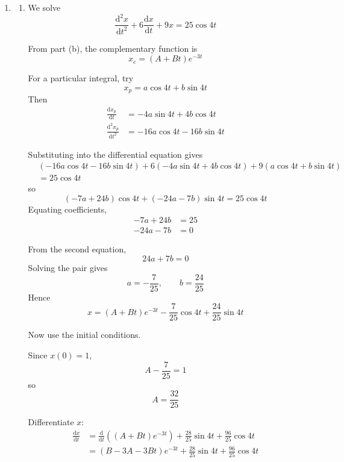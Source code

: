 \documentclass[leqno]{article}
\begin{document}
\begin{enumerate}[
  label=\textbf{\arabic*.},
  leftmargin=*,
  topsep=0pt,
  partopsep=0pt,
  parsep=0pt
]
\begin{tcolorbox}[colback=white, colframe=scarlet, title={\textbf{Solution}}, breakable, grow to left by=6mm, grow to right by=10mm]
\begin{enumerate}[label=\textbf{(\alph*)}]
\begin{enumerate}[label=(\roman*)]
    \item The auxiliary equation is
    \[
    \lambda^2+6\lambda+9=0
    \]
    so
    \[
    (\lambda+3)^2=0
    \]
    There is a repeated real root, so the system is critically damped.

    \item Since the auxiliary equation has repeated root \(\lambda=-3\), the general solution is
    \[
    x=(A+Bt)e^{-3t}
    \]
  \end{enumerate}

  \item
  \begin{enumerate}[label=(\roman*)]
    \item We solve
    \[
    \frac{\mathrm{d}^2x}{\mathrm{d}t^2}+6\frac{\mathrm{d}x}{\mathrm{d}t}+9x=25\cos 4t
    \]

    From part (b), the complementary function is
    \[
    x_c=(A+Bt)e^{-3t}
    \]

    For a particular integral, try
    \[
    x_p=a\cos 4t+b\sin 4t
    \]
    Then
    \begin{align*}
    \frac{\mathrm{d}x_p}{\mathrm{d}t} &= -4a\sin 4t+4b\cos 4t \\
    \frac{\mathrm{d}^2x_p}{\mathrm{d}t^2} &= -16a\cos 4t-16b\sin 4t
    \end{align*}

    Substituting into the differential equation gives
    \begin{align*}
    &(-16a\cos 4t-16b\sin 4t)+6(-4a\sin 4t+4b\cos 4t)+9(a\cos 4t+b\sin 4t) \\
    &= 25\cos 4t
    \end{align*}
    so
    \[
    (-7a+24b)\cos 4t+(-24a-7b)\sin 4t=25\cos 4t
    \]
    Equating coefficients,
    \begin{align*}
    -7a+24b&=25 \\
    -24a-7b&=0
    \end{align*}

    From the second equation,
    \[
    24a+7b=0
    \]
    Solving the pair gives
    \[
    a=-\frac{7}{25}, \qquad b=\frac{24}{25}
    \]
    Hence
    \[
    x=(A+Bt)e^{-3t}-\frac{7}{25}\cos 4t+\frac{24}{25}\sin 4t
    \]

    Now use the initial conditions.

    Since \(x(0)=1\),
    \[
    A-\frac{7}{25}=1
    \]
    so
    \[
    A=\frac{32}{25}
    \]

    Differentiate \(x\):
    \begin{align*}
    \frac{\mathrm{d}x}{\mathrm{d}t}
    &= \frac{\mathrm{d}}{\mathrm{d}t}\left((A+Bt)e^{-3t}\right)+\frac{28}{25}\sin 4t+\frac{96}{25}\cos 4t \\
    &= \left(B-3A-3Bt\right)e^{-3t}+\frac{28}{25}\sin 4t+\frac{96}{25}\cos 4t
    \end{align*}


\end{enumerate}
\end{enumerate}
\end{tcolorbox}
\end{enumerate}
\end{document}
